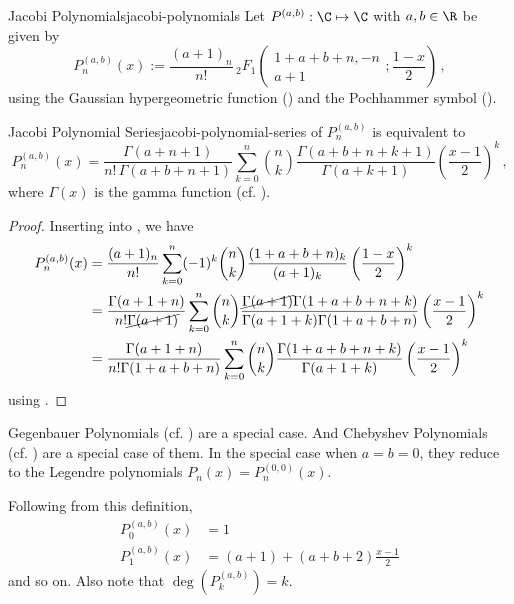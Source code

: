 \begin{definition}{Jacobi Polynomials}{jacobi-polynomials}
  Let $P^{(a, b)}: \C \mapsto \C$ with $a, b \in \R$ be given by
  $$P^{(a,b)}_n(x) := {\frac{(a +1)_{n}}{n!}}\, {}_2F_1\left(\begin{matrix}1+a +b +n, -n \\a + 1\end{matrix}; \frac{1-x}{2}\right)\,,$$
  using the Gaussian hypergeometric function () and the Pochhammer symbol ().
\end{definition}

\begin{lemma}{Jacobi Polynomial Series}{jacobi-polynomial-series}
   of $P_n^{(a, b)}$ is equivalent to
  $$P_{n}^{(a, b)}(x)={\frac  {\Gamma (a +n+1)}{n!\,\Gamma (a +b +n+1)}}\sum _{{k=0}}^{n}\binom{n}{k}{\frac{\Gamma (a +b +n+k+1)}{\Gamma (a +k+1)}}\left({\frac{x-1}{2}}\right)^{k}\,,$$
  where $\Gamma(x)$ is the gamma function (cf. ).
\end{lemma}
\begin{proof}
  Inserting into , we have
  \begin{align*}
    P_{n}^{(a, b)}(x) & = \frac{(a+1)_n}{n!} \sum_{k=0}^n (-1)^k \binom{n}{k} \frac{(1+a+b+n)_k}{(a+1)_k} \left(\frac{1-x}{2}\right)^k                                                                        \\
                      & = \frac{\Gamma(a+1+n)}{n! \cancel{\Gamma(a+1)}} \sum_{k=0}^n \binom{n}{k} \frac{\cancel{\Gamma(a+1)} \Gamma(1+a+b+n + k)}{\Gamma(a+1+k) \Gamma(1+a+b+n)} \left(\frac{x-1}{2}\right)^k \\
                      & = \frac{\Gamma(a+1+n)}{n! \Gamma(1+a+b+n)} \sum_{k=0}^n \binom{n}{k} \frac{\Gamma(1+a+b+n + k)}{\Gamma(a+1+k) } \left(\frac{x-1}{2}\right)^k
  \end{align*}
  using .
\end{proof}

Gegenbauer Polynomials (cf. ) are a special case.
And Chebyshev Polynomials (cf. ) are a special case of them.
In the special case when $a = b = 0$, they reduce to the Legendre polynomials $P_n(x) = P_n^{(0, 0)}(x)$.

Following from this definition,
\begin{align*}
  P_0^{(a, b)}(x)   & = 1                            \\
  P_{1}^{(a, b)}(x) & = (a+1)+(a+b+2){\frac{x-1}{2}}
\end{align*}
and so on.
Also note that $\deg\left(P_k^{(a, b)}\right) = k$.

